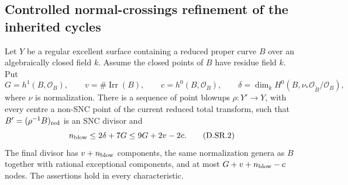 \subsection{Controlled normal-crossings refinement of the inherited cycles}

\begin{lemma}
\label{D:linear-SNC-refinement-centres}
Let $Y$ be a regular excellent surface containing a reduced proper
curve $B$ over an algebraically closed field $k$. Assume the closed
points of $B$ have residue field $k$. Put
\[
 G=h^1(B,\mathcal O_B),\qquad
 v=\#\operatorname{Irr}(B),\qquad c=h^0(B,\mathcal O_B),
 \qquad
 \delta=\dim_k H^0(B,\nu_*\mathcal O_{\widetilde B}/\mathcal O_B),
                                                        \tag{D.SR.1}
\]
where $\nu$ is normalization. There is a sequence of point
blowups $\rho:Y'\to Y$, with every centre a non-SNC point of
the current reduced total transform, such that
$B'=(\rho^{-1}B)_{\rm red}$ is an SNC divisor and
\[
 n_{\rm blow}\le2\delta+7G
             \le9G+2v-2c.                              \tag{D.SR.2}
\]
The final divisor has $v+n_{\rm blow}$ components,
the same normalization genera as $B$ together with rational
exceptional components, and at most
$G+v+n_{\rm blow}-c$ nodes. The assertions hold in every
characteristic.
\end{lemma}

